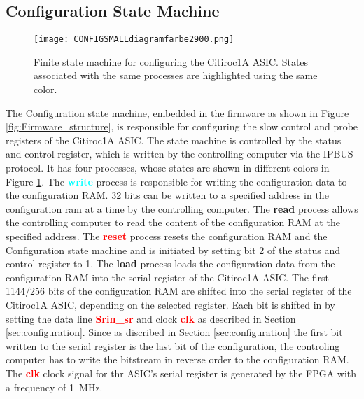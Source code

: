 \subsection{Configuration State Machine}
\begin{figure}[H]
    \centering
    \texttt{[image: CONFIGSMALLdiagramfarbe2900.png]}%
    \caption{Finite state machine for configuring the Citiroc1A ASIC.
    States associated with the same processes are highlighted using the same color.}
    \label{fig:Configuration_state_machine}
\end{figure}
The Configuration state machine, embedded  in the firmware as shown in Figure \ref{fig:Firmware_structure}, is responsible for configuring the slow control and probe registers of the Citiroc1A ASIC.
The state machine is controlled by the status and control register, which is written by the controlling computer via the IPBUS protocol.
It has four processes, whose states are shown in different colors in Figure \ref{fig:Configuration_state_machine}.
\newline
The \textbf{\textcolor{cyan}{write}} process is responsible for writing the configuration data to the configuration RAM.
32 bits can be written to a specified address in the configuration ram at a time by the controlling computer.
\newline
The \textbf{\textcolor{yellow!60!black}{read}} process allows the controlling computer to read the content of the configuration RAM at the specified address.
\newline
The \textbf{\textcolor{red}{reset}} process resets the configuration RAM and the Configuration state machine and is initiated by setting bit 2 of the status and control register to 1.
\newline
The \textbf{\textcolor{VioletRed}{load}} process loads the configuration data from the configuration RAM into the serial register of the Citiroc1A ASIC. 
The first 1144/256 bits of the configuration RAM are shifted into the serial register of the Citiroc1A ASIC, depending on the selected register.
Each bit is shifted in by setting the data line \textbf{\textcolor{red}{Srin\_sr}} and clock \textbf{\textcolor{red}{clk}} as described in Section \ref{sec:configuration}.
Since as discribed in Section \ref{sec:configuration} the first bit written to the serial register is the last bit of the configuration, the controling computer has to write the bitstream in reverse order to the configuration RAM.
\newline
The \textbf{\textcolor{red}{clk}} clock signal for thr ASIC's serial register is generated by the FPGA with a frequency of \SI{1}{\mega\hertz}.
